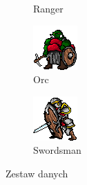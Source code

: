 \begin{figure}[!htb]
\begin{subfigure}[b]{0.2\textwidth}
        \caption{Ranger \cite{48x48-src_ranger}}
    \end{subfigure}
    \begin{subfigure}[b]{0.4\textwidth}
        \centering
        \includegraphics[width=\textwidth]{images/data_set/64x64_orc.png}
        \caption{Orc \cite{64x64-src_orc}}
    \end{subfigure}
    \begin{subfigure}[b]{0.4\textwidth}
        \centering
        \includegraphics[width=\textwidth]{images/data_set/64x64_swordsman.png}
        \caption{Swordsman \cite{64x64-src_swordsman}}
    \end{subfigure}
    \caption{Zestaw danych}
\end{figure}
